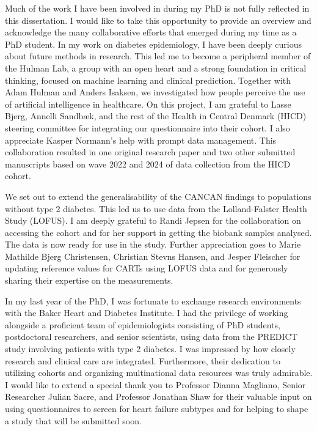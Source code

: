 \documentclass[
  a4paper,
  headsepline=true,
  open=any]{scrbook}
\begin{document}
Much of the work I have been involved in during my PhD is not fully
reflected in this dissertation. I would like to take this opportunity to
provide an overview and acknowledge the many collaborative efforts that
emerged during my time as a PhD student. In my work on diabetes
epidemiology, I have been deeply curious about future methods in
research. This led me to become a peripheral member of the Hulman Lab, a
group with an open heart and a strong foundation in critical thinking,
focused on machine learning and clinical prediction. Together with Adam
Hulman and Anders Isaksen, we investigated how people perceive the use
of artificial intelligence in healthcare. On this project, I am grateful
to Lasse Bjerg, Annelli Sandbæk, and the rest of the Health in Central
Denmark (HICD) steering committee for integrating our questionnaire into
their cohort. I also appreciate Kasper Normann's help with prompt data
management. This collaboration resulted in one original research paper
and two other submitted manuscripts based on wave 2022 and 2024 of data
collection from the HICD cohort.

We set out to extend the generalisability of the CANCAN findings to
populations without type 2 diabetes. This led us to use data from the
Lolland-Falster Health Study (LOFUS). I am deeply grateful to Randi
Jepsen for the collaboration on accessing the cohort and for her support
in getting the biobank samples analysed. The data is now ready for use
in the study. Further appreciation goes to Marie Mathilde Bjerg
Christensen, Christian Stevns Hansen, and Jesper Fleischer for updating
reference values for CARTs using LOFUS data and for generously sharing
their expertise on the measurements.

In my last year of the PhD, I was fortunate to exchange research
environments with the Baker Heart and Diabetes Institute. I had the
privilege of working alongside a proficient team of epidemiologists
consisting of PhD students, postdoctoral researchers, and senior
scientists, using data from the PREDICT study involving patients with
type 2 diabetes. I was impressed by how closely research and clinical
care are integrated. Furthermore, their dedication to utilizing cohorts
and organizing multinational data resources was truly admirable. I would
like to extend a special thank you to Professor Dianna Magliano, Senior
Researcher Julian Sacre, and Professor Jonathan Shaw for their valuable
input on using questionnaires to screen for heart failure subtypes and
for helping to shape a study that will be submitted soon.
\end{document}
